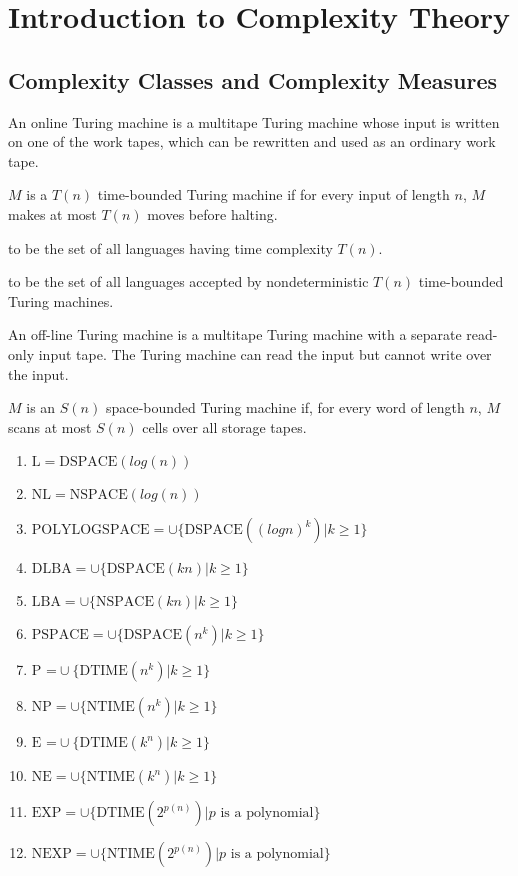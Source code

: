 \section{Introduction to Complexity Theory}

\subsection{Complexity Classes and Complexity Measures}

 An online Turing machine is a multitape Turing machine whose input is written on one
of the work tapes, which can be rewritten and used as an ordinary work tape.

 $M$ is a $T(n)$ time-bounded Turing machine if for every 
input of length $n$, $M$ makes at most $T(n)$ moves before halting. 

 to be the set of all languages having time complexity
$T(n)$.

 to be the set of all languages accepted by nondeterministic
$T(n)$ time-bounded Turing machines.

 An off-line Turing machine is a multitape Turing machine with a separate
read-only input tape. The Turing machine can read the input but cannot write over the
input.

 $M$ is an $S(n)$ space-bounded Turing machine if, for
every word of length $n$, $M$ scans at most $S(n)$ cells over all storage tapes.

\begin{enumerate}
  \item $\text{L} = \text{DSPACE}(log(n))$
  \item $\text{NL} = \text{NSPACE}(log(n))$
  \item $\text{POLYLOGSPACE} = \cup \{\text{DSPACE}((logn)^k) | k \ge 1\}$
  \item $\text{DLBA} = \cup \{\text{DSPACE}(kn) | k \ge 1\}$
  \item $\text{LBA} = \cup \{\text{NSPACE}(kn) | k \ge1\}$
  \item $\text{PSPACE} = \cup \{\text{DSPACE}(n^k) | k \ge 1\}$
  \item $\text{P =} \cup \{\text{DTIME}(n^k) | k \ge 1\}$
  \item $\text{NP} = \cup \{\text{NTIME}(n^k) | k \ge1\}$
  \item $\text{E =} \cup \{\text{DTIME}(k^n) | k \ge 1\}$
  \item $\text{NE} = \cup \{\text{NTIME}(k^n) | k \ge 1\}$
  \item $\text{EXP} = \cup \{\text{DTIME}(2^{p(n)}) | p \text{ is a polynomial}\}$
  \item $\text{NEXP} = \cup \{\text{NTIME}(2^{p(n)}) | p \text{ is a polynomial}\}$
\end{enumerate}

